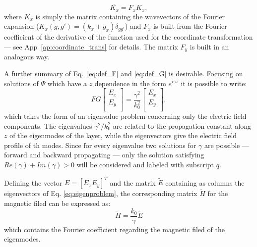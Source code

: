 \documentclass[a4paper,10pt]{report}
\begin{document}
\begin{equation} \label{eq:K_bar}
\bar{K_x} = F_x K_x,
\end{equation}
where $K_x$ is simply the matrix containing the wavevectors of the Fourier expansion ($K_x(g,g') = (k_x+g_x)\delta_{gg'}$) and $F_x$ is built from the Fourier coefficient of the derivative of the function used for the coordinate transformation --- see App~\ref{ap:coordinate_trans} for details. The matrix $F_y$ is built in an analogous way.

A further summary of Eq.~\ref{eq:def_F} and \ref{eq:def_G} is desirable. Focusing on solutions of $\Psi$ which have a $z$ dependence in the form $e^{i\gamma z}$ it is possible to write:
\begin{equation} \label{eq:eigenproblem}
FG \left[ \begin{array}{c} E_x \\ E_y \\ \end{array} \right] = \frac{\gamma^2}{k_0^2} \left[ \begin{array}{c} E_x \\ E_y \\ \end{array} \right],
\end{equation}
which takes the form of an eigenvalue problem concerning only the electric field components. The eigenvalues $\gamma^2/k_0^2$ are related to the propagation constant along $z$ of the eigenmodes of the layer, while the eigenvectors give the electric field profile of th modes. Since for every eigenvalue two solutions for $\gamma$ are possible --- forward and backward propagating --- only the solution satisfying $Re(\gamma)+Im(\gamma) > 0 $ will be considered and labeled with subscript $q$. 

Defining the vector $E=[E_x E_y]^T$ and the matrix $\tilde{E}$ containing as columns the eigenvectors of Eq. \ref{eq:eigenproblem}, the corresponding matrix $\tilde{H}$ for the magnetic filed can be expressed as:
\begin{equation} \label{eq:Htilde}
\tilde{H} = \frac{k_0}{\gamma} \tilde{E} 
\end{equation}
which contains the Fourier coefficient regarding the magnetic filed of the eigenmodes. 
\end{document}
